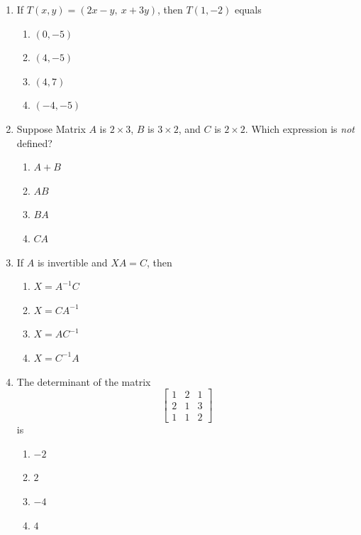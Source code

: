 \documentclass[11pt]{article}
\newif\ifshowsolutions
\newcommand{\mcneedspace}{\ifshowsolutions\Needspace{12\baselineskip}\fi}
\newcommand{\solution}[1]{%
  \ifshowsolutions
    \par\medskip
    {\color{solutionblue}\textbf{Solution.} #1}
    \par\medskip
  \fi}
\begin{document}
\begin{enumerate}
\mcneedspace
\item If $T(x,y)=(2x-y,\ x+3y)$, then $T(1,-2)$ equals
\begin{enumerate}[label=\Alph*.]
  \item $(0,-5)$
  \item $(4,-5)$
  \item $(4,7)$
  \item $(-4,-5)$
\end{enumerate}
\solution{\textbf{B.} Substitution gives $T(1,-2)=(2+2,1-6)=(4,-5)$.}

\mcneedspace
\item Suppose Matrix $A$ is $2\times3$, $B$ is $3\times2$, and $C$ is $2\times2$. Which expression is \emph{not} defined?
\begin{enumerate}[label=\Alph*.]
  \item $A+B$
  \item $AB$
  \item $BA$
  \item $CA$
\end{enumerate}
\solution{\textbf{A.} Matrix addition requires equal dimensions, but $A$ and $B$ have different sizes.}

\mcneedspace
\item If $A$ is invertible and $XA=C$, then
\begin{enumerate}[label=\Alph*.]
  \item $X=A^{-1}C$
  \item $X=CA^{-1}$
  \item $X=AC^{-1}$
  \item $X=C^{-1}A$
\end{enumerate}
\solution{\textbf{B.} Multiply on the right by $A^{-1}$: $XAA^{-1}=CA^{-1}$.}

\mcneedspace
\item The determinant of the matrix
\[
\begin{bmatrix}
1&2&1\\
2&1&3\\
1&1&2
\end{bmatrix}
\]
is
\begin{enumerate}[label=\Alph*.]
  \item $-2$
  \item $2$
  \item $-4$
  \item $4$
\end{enumerate}
\solution{\textbf{A.} Expanding along the first row gives
$1(2-3)-2(4-3)+(2-1)=-1-2+1=-2$.}


\end{enumerate}
\end{document}
